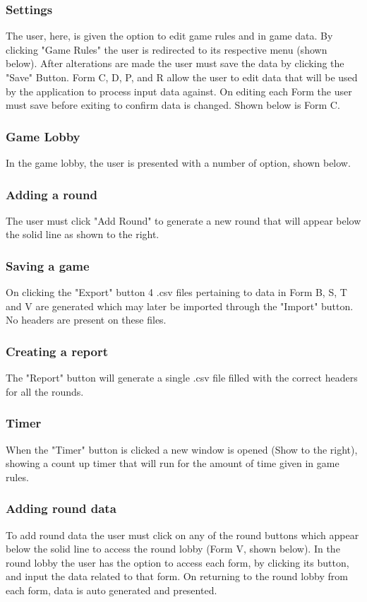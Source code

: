 \documentclass{l3proj}
\begin{document}
\subsubsection{Settings}
The user, here, is given the option to edit game rules and in game data. 
By clicking "Game Rules" the user is redirected to its respective menu (shown below). After alterations are made the user must save the data by clicking the "Save" Button.
Form C, D, P, and R allow the user to edit data that will be used by the application to process input data against. On editing each Form the user must save before exiting to confirm data is changed. 
Shown below is Form C.
\subsubsection{Game Lobby}
In the game lobby, the user is presented with a number of option, shown below.
\subsubsection{Adding a round}
The user must click "Add Round" to generate a new round that will appear below the solid line as shown to the right.
\subsubsection{Saving a game}
On clicking the "Export" button 4 .csv files pertaining to data in Form B, S, T and V are generated which may later be imported through the "Import" button. No headers are present on these files.
\subsubsection{Creating a report}
The "Report" button will generate a single .csv file filled with the correct headers for all the rounds.
\subsubsection{Timer}
When the "Timer" button is clicked a new window is opened (Show to the right), showing a count up timer that will run for the amount of time given in game rules.
\subsubsection{Adding round data}
To add round data the user must click on any of the round buttons which appear below the solid line to access the round lobby (Form V, shown below).
In the round lobby the user has the option to access each form, by clicking its button, and input the data related to that form. On returning to the round lobby from each form, data is auto generated and presented.
\end{document}

